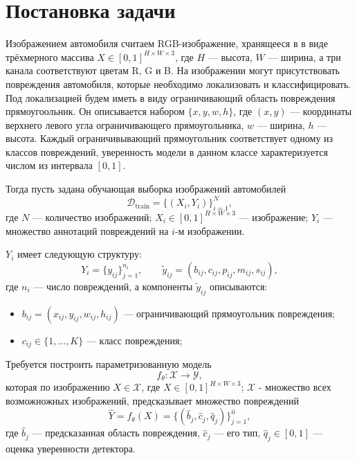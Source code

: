 \documentclass[12pt,a4paper]{article}
\begin{document}
\section{Постановка задачи}


Изображением автомобиля считаем RGB-изображение, хранящееся 
в в виде трёхмерного массива $X\in[0,1]^{H\times W\times 3}$, 
где $H$ --- высота, $W$ --- ширина, а три канала 
соответствуют цветам R, G и B. На изображении могут 
присутствовать повреждения автомобиля, которые 
необходимо локализовать и классифицировать.
Под локализацией будем иметь в виду ограничивающий область повреждения прямоугоольник. 
Он описывается набором
 $\{x, y, w, h\}$, где $(x, y)$ 
--- координаты верхнего левого угла ограничивающего 
прямоугольника, $w$ --- ширина, $h$ --- высота.
Каждый ограничивывающий прямоугольник соответствует 
одному из классов повреждений, 
уверенность модели в данном классе характеризуется числом из интервала $[0,1]$.


Тогда пусть задана обучающая выборка изображений автомобилей
\begin{equation*}
    \mathcal D_{\mathrm{train}} = \{(X_i,Y_i)\}_{i=1}^{N},
\end{equation*}
где $N$ --- количество изображений; $X_i\in[0,1]^{H\times W\times 3}$ --- изображение;
$Y_i$ --- множество аннотаций повреждений на $i$-м изображении.

$Y_i$ имеет следующую структуру: 
\begin{equation*}
    Y_i = \{y_{ij}\}_{j=1}^{n_i},
    \qquad
    \tilde{y}_{ij} = (b_{ij},c_{ij},p_{ij},m_{ij},s_{ij}),
\end{equation*}
где $n_i$ --- число повреждений, а
 компоненты $\tilde{y}_{ij}$ описываются:
\begin{itemize}[leftmargin=*,itemsep=2pt,topsep=3pt]
    \item $b_{ij}=(x_{ij},y_{ij},w_{ij},h_{ij})$ --- ограничивающий прямоугольник повреждения;
    \item $c_{ij}\in\{1,\ldots,K\}$ --- класс повреждения;
\end{itemize}


Требуется построить параметризованную модель
\begin{equation*}
    f_\theta:\mathcal X\to\mathcal Y,
\end{equation*}
которая по изображению $X \in \mathcal X$, где $X \in[0,1]^{H\times W\times 3}$;
$\mathcal X$ - множество всех возможножных изображений, 
предсказывает множество повреждений
\begin{equation*}
    \widehat Y=f_\theta(X)
    =\{(\widehat b_j,\widehat c_j,\widehat q_j)\}_{j=1}^{\widehat n},
\end{equation*}
где $\widehat b_j$ --- предсказанная область повреждения, $\widehat c_j$ --- его тип, $\widehat q_j\in[0,1]$ --- оценка уверенности детектора.
\end{document}
